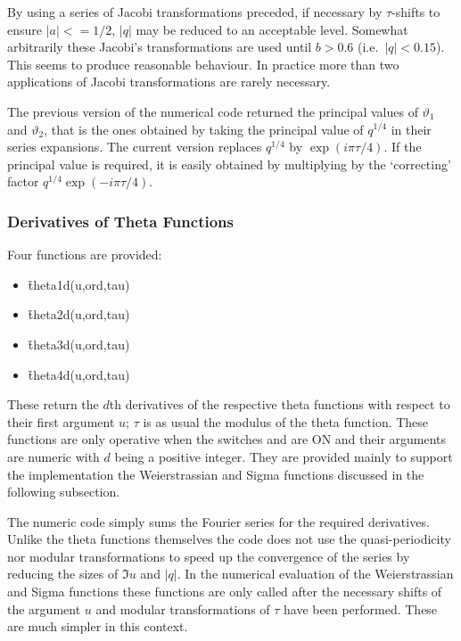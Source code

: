 By using a series of Jacobi transformations preceded, if necessary by
$\tau$-shifts to ensure $|a| <= 1/2$, $|q|$ may be reduced to an acceptable
level. Somewhat arbitrarily these Jacobi's transformations are used
until $b > 0.6$ (i.e.~$|q| < 0.15$). This seems to produce reasonable
behaviour. In practice more than two applications of Jacobi transformations
are rarely necessary.

The previous version of the numerical code returned the principal values
of $\vartheta_1$ and $\vartheta_2$, that is the ones obtained by taking
the principal value of $q^{1/4}$ in their series expansions. The current version replaces
$q^{1/4}$ by $\exp(i\pi\tau/4)$.  If the principal value is required, it is easily obtained
by multiplying by the `correcting' factor $q^{1/4}\exp(-i\pi\tau/4)$.

\subsubsection{Derivatives of Theta Functions}

\hypertarget{THETAD}{}
 
Four functions are provided:
\begin{itemize}
\item \f{theta1d(u,ord,tau)}
\item \f{theta2d(u,ord,tau)}
\item \f{theta3d(u,ord,tau)}
\item \f{theta4d(u,ord,tau)}
\end{itemize}
These return the $d$th derivatives of the respective theta functions
with respect to their first argument $u$; $\tau$ is as usual the modulus
of the theta function. These functions are only operative when the switches
 and  are ON and their arguments are numeric with
$d$ being a positive integer.  They are provided mainly to support the implementation
the Weierstrassian and Sigma functions discussed in the following subsection.

The numeric code simply sums the Fourier series for the required derivatives.
Unlike the theta functions themselves the code does not use the quasi-periodicity nor
modular transformations to speed  up the convergence of the series by reducing the sizes
of $\Im u$ and $|q|$.  In the numerical evaluation of the Weierstrassian and Sigma functions
these functions are only called after the necessary shifts of the argument $u$ and modular
transformations of $\tau$ have been performed. These are much simpler in this context.

